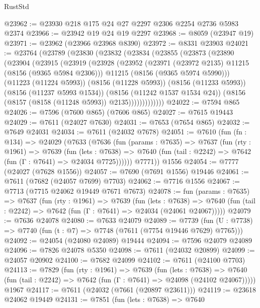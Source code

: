 \begin{lexlean}{RustStd}
\begin{coremodule}
{\begin{coremodule}
{{{{{{{{{{{{{{{{{{{{{{{{{{{{{{{{{{@23962 := @23930 @218 @175 @24 @27 @2297 @2306 @2254 @2736 @5983 @2374
@23966 := @23942 @19 @24 @19 @2297
@23968 := @8059 (@23947 @19)
@23971 := @23962 (@23966 @23968 @8390)
@23972 := @8331 @23903
@24021 := @23764
    (@23789
      (@23830
        (@23832
          (@23834
            (@23855
              (@23873
                (@23890
                  (@23904
                    (@23915
                      (@23919
                        (@23928
                          (@23952
                            (@23971 (@23972 @2135) @11215 (@8156 (@9365 @5984 @2306)))
                            @11215
                            (@8156 (@9365 @5974 @5990)))
                          (@11223 (@11224 @5993))
                          (@8156 (@11228 @5993))
                          (@8156 (@11233 @5993))
                          (@8156 (@11237 @5993 @1534))
                          (@8156 (@11242 @1537 @1534 @24))
                          (@8156 (@8157 (@8158 (@11248 @5993)) @2135)))))))))))))
@24022 := @7594 @865
@24026 := @7596 (@7600 @865) (@7606 @865)
@24027 := @7615 @19443
@24029 := @7611 (@24027 @7630)
@24031 := @7653 (@7654 @865)
@24032 := @7649 @24031
@24034 := @7611 (@24032 @7678)
@24051 := @7610
    (fun (fn : @134) =>
    @24029
      (@7633
        (@7636
          (fun (params : @7635) =>
          @7637
            (fun (rty : @1961) =>
            @7639
              (fun (lets : @7638) =>
              @7640 (fun (tail : @2242) => @7642 (fun (Γ : @7641) => @24034 @7725))))))
        @7771))
    @1556
@24054 := @7777 (@24027 (@7628 @1556))
@24057 := @7690 (@7691 @1556) @19446
@24061 := @7611 (@7682 (@24057 @7699) @7703)
@24062 := @7716 @1556
@24067 := @7713 (@7715 @24062 @19449 @7671 @7673)
@24078 := fun (params : @7635) =>
  @7637
    (fun (rty : @1961) =>
    @7639
      (fun (lets : @7638) =>
      @7640 (fun (tail : @2242) => @7642 (fun (Γ : @7641) => @24034 (@24061 @24067)))))
@24079 := @7636 @24078
@24080 := @7633 @24079
@24089 := @7739
    (fun (U : @7738) => @7740 (fun (t : @7) => @7748 (@7611 (@7754 @19446 @7629) @7765)))
@24092 := @24054 (@24080 @24089) @19444
@24094 := @7596 @24079 @24089
@24096 := @7826 @24078 @5350
@24098 := @7611 (@24032 @20899)
@24099 := @24057 @20902
@24100 := @7682 @24099
@24102 := @7611 (@24100 @7703)
@24113 := @7829
    (fun (rty : @1961) =>
    @7639
      (fun (lets : @7638) =>
      @7640 (fun (tail : @2242) => @7642 (fun (Γ : @7641) => @24098 (@24102 @24067)))))
    @1967
@24117 := @7611 (@24032 (@7661 (@20897 @23611)))
@24119 := @23618 @24062 @19449
@24131 := @7851
    (fun (lets : @7638) =>
    @7640
}}}}}}}}}}}}}}}}}}}}}}}}}}}}}}}}}}
\end{coremodule}}
\end{coremodule}
\end{lexlean}
